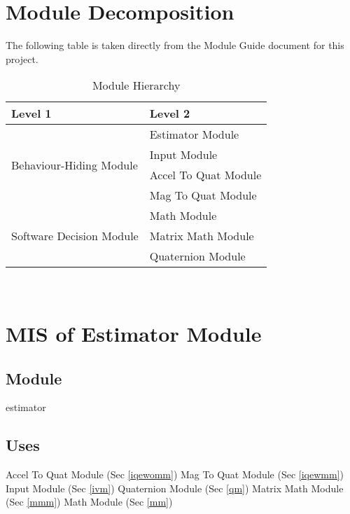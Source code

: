 \documentclass[12pt, titlepage]{article}
\begin{document}
\section{Module Decomposition}

The following table is taken directly from the Module Guide document for this project.

\begin{table}[h!]
\centering
\begin{tabular}{p{} p{}}
\toprule
\textbf{Level 1} & \textbf{Level 2}\\
\midrule


\multirow{4}{0.3\textwidth}{Behaviour-Hiding Module} & Estimator Module \\
  & Input Module \\
  & Accel To Quat Module \\
  & Mag To Quat Module \\
\midrule
\multirow{3}{0.3\textwidth}{Software Decision Module} & Math Module\\
  & Matrix Math Module \\
  & Quaternion Module \\
\bottomrule

\end{tabular}
\caption{Module Hierarchy}
\label{TblMH}
\end{table}

\newpage
~\newpage

\section{MIS of Estimator Module} \label{em}

\subsection{Module}
estimator

\subsection{Uses}
Accel To Quat Module (Sec \ref{iqewomm}) \newline
Mag To Quat Module (Sec \ref{iqewmm}) \newline
Input Module (Sec \ref{ivm}) \newline
Quaternion Module (Sec \ref{qm})\newline
Matrix Math Module (Sec \ref{mmm}) \newline
Math Module (Sec \ref{mm})
\end{document}
